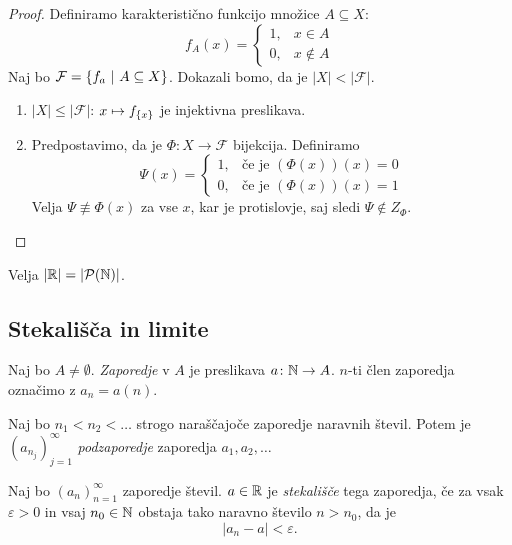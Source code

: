 \documentclass[12pt, a4paper]{article}
\begin{document}
\begin{proof}
Definiramo karakteristično funkcijo množice $A\subseteq X$:
\[
f_A(x)=\begin{cases}
1, &x\in A\\
0, &x\not\in A
\end{cases}
\]
Naj bo $\mathcal{F}=\left\{f_a~\middle\vert~A\subseteq X\right\}$. Dokazali bomo, da je $|X|<|\mathcal{F}|$.

\begin{enumerate}[label=\roman*)]
\item $|X|\leq|\mathcal{F}|$: $x\mapsto f_{\left\{x\right\}}$ je injektivna preslikava.
\item Predpostavimo, da je $\Phi:X\to\mathcal{F}$ bijekcija. Definiramo
\[
\Psi(x)=\begin{cases}
1, &\text{če je $(\Phi(x))(x)=0$}\\
0, &\text{če je $(\Phi(x))(x)=1$}
\end{cases}
\]
Velja $\Psi\not\equiv\Phi(x)$ za vse $x$, kar je protislovje, saj sledi $\Psi\not\in Z_{\Phi}$.\qedhere
\end{enumerate}
\end{proof}

\begin{opomba}
Velja $|\mathbb{R}|=|\mathcal{P}(\mathbb{N})|$.
\end{opomba}

\newpage

\subsection{Stekališča in limite}

\begin{okvir}
\begin{definicija}
Naj bo $A\ne\emptyset$. \emph{Zaporedje} v $A$ je preslikava $a\colon \mathbb{N}\to A$. $n$-ti člen zaporedja označimo z $a_n=a(n)$.
\end{definicija}
\end{okvir}

\begin{definicija}
Naj bo $n_1<n_2<\dots$ strogo naraščajoče zaporedje naravnih števil. Potem je $(a_{n_j})_{j=1}^\infty$ \emph{podzaporedje} zaporedja $a_1,a_2,\dots$
\end{definicija}

\begin{definicija}
Naj bo $(a_n)_{n=1}^\infty$ zaporedje števil. $a\in\mathbb{R}$ je \emph{stekališče} tega zaporedja, če za vsak $\varepsilon>0$ in vsaj $n_0\in\mathbb{N}$ obstaja tako naravno število $n>n_0$, da je
\[
|a_n-a|<\varepsilon.
\]
\end{definicija}
\end{document}
